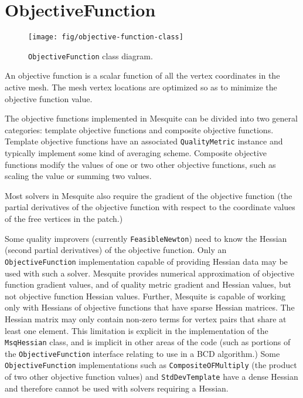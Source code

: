 \documentclass{article}
\begin{document}
\section{ObjectiveFunction}

\label{sec:ObjectiveFunction}

\begin{figure}[htb]
\begin{center}
\texttt{[image: fig/objective-function-class]}
\caption{\texttt{ObjectiveFunction} class diagram.\label{fig:objfunc-class}}
\end{center}
\end{figure}

An objective function is a scalar function of all the vertex coordinates in the active mesh.  The mesh vertex locations are optimized so as to minimize the objective function value.  

The objective functions implemented in Mesquite can be divided into two general categories: template objective functions and composite objective functions.  Template objective functions have an associated \texttt{QualityMetric} instance and typically implement some kind of averaging scheme.  Composite objective functions modify the values of one or two other objective functions, such as scaling the value or summing two values.

Most solvers in Mesquite also require the gradient of the objective function (the partial derivatives of the objective function with respect to the coordinate values of the free vertices in the patch.)  

\label{sec:Hessian} Some quality improvers (currently \texttt{FeasibleNewton}) need to know the Hessian (second partial derivatives) of the objective function.  Only an \texttt{ObjectiveFunction} implementation capable of providing Hessian data may be used with such a solver.  Mesquite provides numerical approximation of objective function gradient values, and of quality metric gradient and Hessian values, but not objective function Hessian values.  Further, Mesquite is capable of working only with Hessians of objective functions that have sparse Hessian matrices.  The Hessian matrix may only contain non-zero terms for vertex pairs that share at least one element.  This limitation is explicit in the implementation of the \texttt{MsqHessian} class, and is implicit in other areas of the code (such as portions of the \texttt{ObjectiveFunction} interface relating to use in a BCD algorithm.)  Some \texttt{ObjectiveFunction} implementations such as \texttt{CompositeOFMultiply} (the product of two other objective function values) and \texttt{StdDevTemplate} have a dense Hessian and therefore cannot be used with solvers requiring a Hessian.
\end{document}
